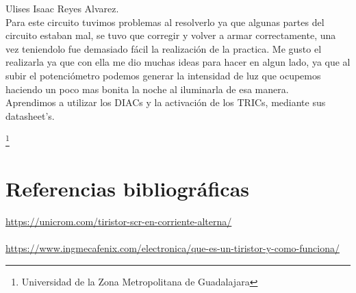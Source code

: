 \documentclass[10pt,a4paper]{article}
\begin{document}
Ulises Isaac Reyes Alvarez.\\
Para este circuito tuvimos problemas al resolverlo ya que algunas partes del circuito estaban mal, se tuvo que corregir y volver a armar correctamente, una vez teniendolo fue demasiado fácil la realización de la practica. Me gusto el realizarla ya que con ella me dio muchas ideas para hacer en algun lado, ya que al subir el potenciómetro podemos generar la intensidad de luz que ocupemos haciendo un poco mas bonita la noche al iluminarla de esa manera.\\
Aprendimos a utilizar los DIACs y la activación de los TRICs, mediante sus datasheet's.

\footnote{Universidad de la Zona Metropolitana de Guadalajara}

\newpage
\section{Referencias bibliográficas}
\url{https://unicrom.com/tiristor-scr-en-corriente-alterna/}\\\\
\url{https://www.ingmecafenix.com/electronica/que-es-un-tiristor-y-como-funciona/}
\end{document}
